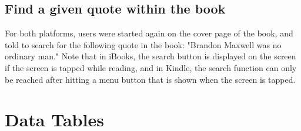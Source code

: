 \documentclass[11pt, oneside]{article}
\begin{document}
\subsection{Find a given quote within the book}
For both platforms, users were started again on the cover page of the book, and told to search for the following quote in the book: "Brandon Maxwell was no ordinary man." Note that in iBooks, the search button is displayed on the screen if the screen is tapped while reading, and in Kindle, the search function can only be reached after hitting a menu button that is shown when the screen is tapped.


\section{Data Tables}
\end{document}

